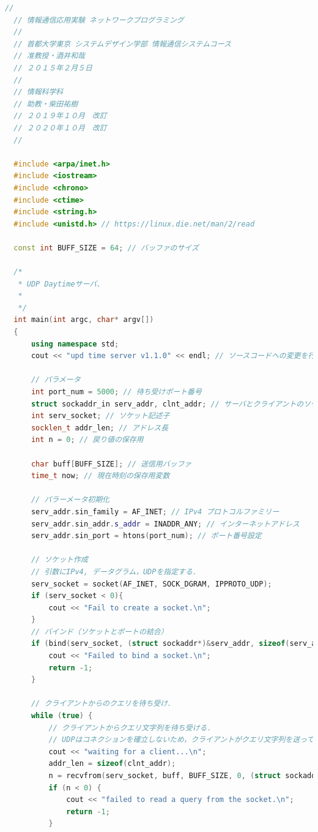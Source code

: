 \documentclass[fleqn, a4paper. 12pt]{ltjsarticle}
\begin{document}
\begin{lstlisting}[language=C++]
  //
  // 情報通信応用実験 ネットワークプログラミング
  //
  // 首都大学東京 システムデザイン学部 情報通信システムコース
  // 准教授・酒井和哉
  // ２０１５年２月５日
  //
  // 情報科学科
  // 助教・柴田祐樹
  // ２０１９年１０月　改訂
  // ２０２０年１０月　改訂
  //
  
  #include <arpa/inet.h>
  #include <iostream>
  #include <chrono>
  #include <ctime>
  #include <string.h>
  #include <unistd.h> // https://linux.die.net/man/2/read
  
  const int BUFF_SIZE = 64; // バッファのサイズ
  
  /*
   * UDP Daytimeサーバ.
   *
   */
  int main(int argc, char* argv[])
  {
      using namespace std;
      cout << "upd time server v1.1.0" << endl; // ソースコードへの変更を行ったら数値を変える．
  
      // パラメータ
      int port_num = 5000; // 待ち受けポート番号
      struct sockaddr_in serv_addr, clnt_addr; // サーバとクライアントのソケットアドレス
      int serv_socket; // ソケット記述子
      socklen_t addr_len; // アドレス長
      int n = 0; // 戻り値の保存用
  
      char buff[BUFF_SIZE]; // 送信用バッファ
      time_t now; // 現在時刻の保存用変数
  
      // パラーメータ初期化
      serv_addr.sin_family = AF_INET; // IPv4 プロトコルファミリー
      serv_addr.sin_addr.s_addr = INADDR_ANY; // インターネットアドレス
      serv_addr.sin_port = htons(port_num); // ポート番号設定
  
      // ソケット作成
      // 引数にIPv4, データグラム，UDPを指定する．
      serv_socket = socket(AF_INET, SOCK_DGRAM, IPPROTO_UDP);
      if (serv_socket < 0){
          cout << "Fail to create a socket.\n";
      }
      // バインド（ソケットとポートの結合）
      if (bind(serv_socket, (struct sockaddr*)&serv_addr, sizeof(serv_addr)) < 0) {
          cout << "Failed to bind a socket.\n";
          return -1;
      }
  
      // クライアントからのクエリを待ち受け．
      while (true) {
          // クライアントからクエリ文字列を待ち受ける．
          // UDPはコネクションを確立しないため，クライアントがクエリ文字列を送ってくるのを待機．
          cout << "waiting for a client...\n";
          addr_len = sizeof(clnt_addr);
          n = recvfrom(serv_socket, buff, BUFF_SIZE, 0, (struct sockaddr*)&clnt_addr, &addr_len);
          if (n < 0) {
              cout << "failed to read a query from the socket.\n";
              return -1;
          }
  

\end{lstlisting}
\end{document}
